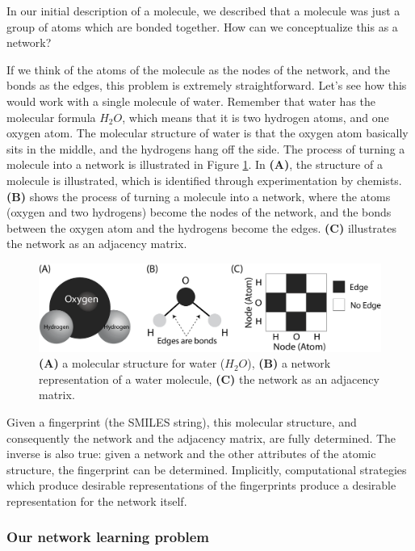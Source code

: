 In our initial description of a molecule, we described that a molecule was just a group of atoms which are bonded together. How can we conceptualize this as a network?

If we think of the atoms of the molecule as the nodes of the network, and the bonds as the edges, this problem is extremely straightforward. Let's see how this would work with a single molecule of water. Remember that water has the molecular formula $H_2O$, which means that it is two hydrogen atoms, and one oxygen atom. The molecular structure of water is that the oxygen atom basically sits in the middle, and the hydrogens hang off the side. The process of turning a molecule into a network is illustrated in Figure \ref{fig:next:gnn:molecule}. In \textbf{(A)}, the structure of a molecule is illustrated, which is identified through experimentation by chemists. \textbf{(B)} shows the process of turning a molecule into a network, where the atoms (oxygen and two hydrogens) become the nodes of the network, and the bonds between the oxygen atom and the hydrogens become the edges. \textbf{(C)} illustrates the network as an adjacency matrix.

\begin{figure}
    \centering
    \includegraphics[width=\linewidth]{next/Images/water_molecule.png}
    \caption{\textbf{(A)} a molecular structure for water ($H_2 O$), \textbf{(B)} a network representation of a water molecule, \textbf{(C)} the network as an adjacency matrix.}
    \label{fig:next:gnn:molecule}
\end{figure}

Given a fingerprint (the SMILES string), this molecular structure, and consequently the network and the adjacency matrix, are fully determined. The inverse is also true: given a network and the other attributes of the atomic structure, the fingerprint can be determined. Implicitly, computational strategies which produce desirable representations of the fingerprints produce a desirable representation for the network itself.

\subsubsection*{Our network learning problem}

